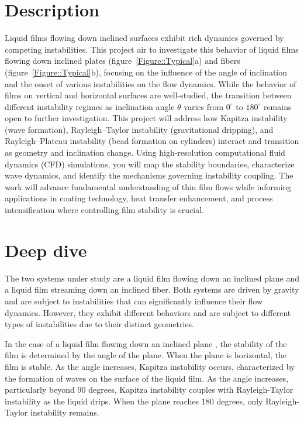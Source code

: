 \documentclass[11pt]{article}
\begin{document}
\section*{Description}

Liquid films flowing down inclined surfaces exhibit rich dynamics governed by competing instabilities. This project air to investigate this behavior of liquid films flowing down inclined plates (figure~\ref{Figure::Typical}a) and fibers  (figure~\ref{Figure::Typical}b), focusing on the influence of the angle of inclination and the onset of various instabilities on the flow dynamics. While the behavior of films on vertical and horizontal surfaces are well-studied, the transition between different instability regimes as inclination angle $\theta$ varies from $0^\circ$ to $180^\circ$ remains open to further investigation. This project will address how Kapitza instability (wave formation), Rayleigh--Taylor instability (gravitational dripping), and Rayleigh--Plateau instability (bead formation on cylinders) interact and transition as geometry and inclination change. Using high-resolution computational fluid dynamics (CFD) simulations, you will map the stability boundaries, characterize wave dynamics, and identify the mechanisms governing instability coupling. The work will advance fundamental understanding of thin film flows while informing applications in coating technology, heat transfer enhancement, and process intensification where controlling film stability is crucial.

\section*{Deep dive}
The two systems under study are a liquid film flowing down an inclined plane and a liquid film streaming down an inclined fiber. Both systems are driven by gravity and are subject to instabilities that can significantly influence their flow dynamics. However, they exhibit different behaviors and are subject to different types of instabilities due to their distinct geometries.

In the case of a liquid film flowing down an inclined plane \citep{craster2009dynamics}, the stability of the film is determined by the angle of the plane. When the plane is horizontal, the film is stable. As the angle increases, Kapitza instability occurs, characterized by the formation of waves on the surface of the liquid film. As the angle increases, particularly beyond 90 degrees, Kapitza instability couples with Rayleigh-Taylor instability as the liquid drips. When the plane reaches 180 degrees, only Rayleigh-Taylor instability remains.
\end{document}
